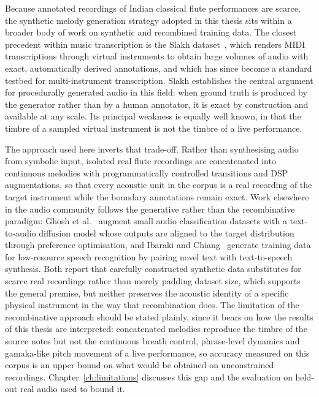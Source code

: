 Because annotated recordings of Indian classical flute performances are scarce, the synthetic melody generation strategy adopted in this thesis sits within a broader body of work on synthetic and recombined training data. The closest precedent within music transcription is the Slakh dataset~\cite{ref37}, which renders MIDI transcriptions through virtual instruments to obtain large volumes of audio with exact, automatically derived annotations, and which has since become a standard testbed for multi-instrument transcription. Slakh establishes the central argument for procedurally generated audio in this field: when ground truth is produced by the generator rather than by a human annotator, it is exact by construction and available at any scale. Its principal weakness is equally well known, in that the timbre of a sampled virtual instrument is not the timbre of a live performance.

The approach used here inverts that trade-off. Rather than synthesising audio from symbolic input, isolated real flute recordings are concatenated into continuous melodies with programmatically controlled transitions and DSP augmentations, so that every acoustic unit in the corpus is a real recording of the target instrument while the boundary annotations remain exact. Work elsewhere in the audio community follows the generative rather than the recombinative paradigm: Ghosh et al.~\cite{ref38} augment small audio classification datasets with a text-to-audio diffusion model whose outputs are aligned to the target distribution through preference optimisation, and Ibaraki and Chiang~\cite{ref39} generate training data for low-resource speech recognition by pairing novel text with text-to-speech synthesis. Both report that carefully constructed synthetic data substitutes for scarce real recordings rather than merely padding dataset size, which supports the general premise, but neither preserves the acoustic identity of a specific physical instrument in the way that recombination does. The limitation of the recombinative approach should be stated plainly, since it bears on how the results of this thesis are interpreted: concatenated melodies reproduce the timbre of the source notes but not the continuous breath control, phrase-level dynamics and gamaka-like pitch movement of a live performance, so accuracy measured on this corpus is an upper bound on what would be obtained on unconstrained recordings. Chapter~\ref{ch:limitations} discusses this gap and the evaluation on held-out real audio used to bound it.

